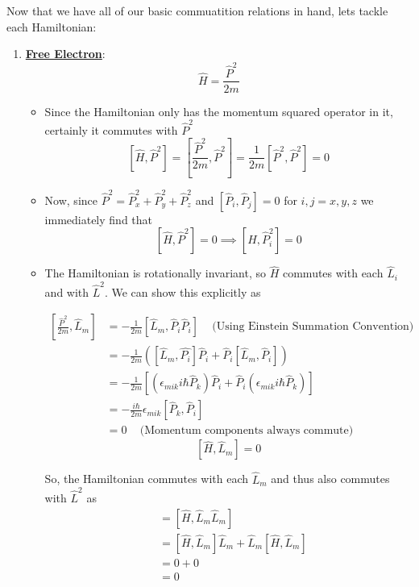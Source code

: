 \documentclass{article}
\begin{document}
\vskip 1cm 
Now that we have all of our basic commuatition relations in hand, lets tackle each Hamiltonian:
\begin{enumerate}[label=(\alph*)]
  \item \underline{\textbf{Free Electron}}: 
  \[ \hat{H} = \frac{\hat{P}^2}{2m} \]

  \begin{itemize}
    \item Since the Hamiltonian only has the momentum squared operator in it, certainly it commutes with $\hat{P}^2$
    \[ [\hat{H}, \hat{P}^2] = [\frac{\hat{P}^2}{2m}, \hat{P}^2] = \frac{1}{2m}[\hat{P}^2, \hat{P}^2] = 0\]

    \item Now, since $\hat{P}^2 = \hat{P}_x^2 + \hat{P}_y^2 + \hat{P}_z^2$ and $[\hat{P}_i, \hat{P}_j] = 0$ for $i,j = x, y, z$ we immediately find that 
    \[ [\hat{H}, \hat{P}^2] = 0 \implies [\hat{H}, \hat{P}_i^2] = 0 \] 

    \item The Hamiltonian is rotationally invariant, so $\hat{H}$ commutes with each $\hat{L}_i$ and with $\hat{L}^2$. We can show this explicitly as 
    
    \begin{align*}
      \left[\frac{\hat{P}^2}{2m}, \hat{L}_m\right] &= -\frac{1}{2m} \left[ \hat{L}_m, \hat{P}_i \hat{P}_i \right]\;\;\;\text{ (Using Einstein Summation Convention)} \\
      &= -\frac{1}{2m} \left( [\hat{L}_m, \hat{P_i}]\hat{P}_i + \hat{P}_i[\hat{L}_m, \hat{P}_i] \right) \\
      &= -\frac{1}{2m} \left[ (\epsilon_{mik} i\hbar \hat{P}_k)\hat{P}_i  + \hat{P}_i(\epsilon_{mik} i\hbar \hat{P}_k) \right] \\
      &= -\frac{i\hbar}{2m}\epsilon_{mik}[\hat{P}_k, \hat{P}_i] \\
      &= 0 \;\;\;\text{ (Momentum components always commute)}
    \end{align*}
    \[ \boxed{ [\hat{H}, \hat{L}_m] = 0 } \]

    So, the Hamiltonian commutes with each $\hat{L}_m$ and thus also commutes with $\hat{L}^2$ as 
    \begin{align*}
      [\hat{H}, \hat{L}^2] &= [\hat{H}, \hat{L}_m\hat{L}_m] \\
      &= [\hat{H}, \hat{L}_m]\hat{L}_m + \hat{L}_m[\hat{H}, \hat{L}_m] \\
      &= 0 + 0 \\
      &= 0
    \end{align*}
    

\end{itemize}
\end{enumerate}
\end{document}
